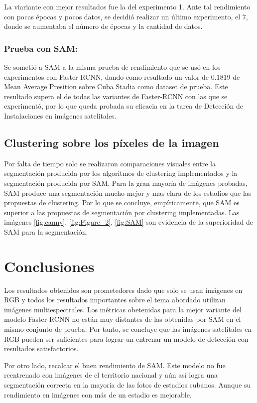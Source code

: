 \documentclass[article]{llncs}
\begin{document}
La viariante con mejor resultados fue la del experimento 1. Ante tal rendimiento con pocas \'epocas y pocos datos, se decidió 
realizar un \'ultimo experimento, el 7, donde se aumentaba el n\'umero de \'epocas y la cantidad de datos.

\subsubsection{Prueba con SAM:} Se someti\'o a SAM a la misma prueba de rendimiento que se us\'o en los experimentos con 
Faster-RCNN, dando como resultado un valor de 0.1819 de Mean Average Presition sobre Cuba Stadia como dataset de prueba.
Este resultado supera el de todas las variantes de Faster-RCNN con las que se experiment\'o, por lo que queda probada su eficacia 
en la tarea de Detección de Instalaciones en im\'agenes satelitales.

\subsection{Clustering sobre los p\'ixeles de la imagen}

Por falta de tiempo solo se realizaron comparaciones visuales entre la segmentación producida por los algoritmos de clustering 
implementados y la segmentación producida por SAM. Para la gran mayor\'ia de im\'agenes probadas, SAM produce 
una segmentación mucho mejor y mas clara de los estadios que las propuestas de clustering. Por lo que se concluye, 
emp\'iricamente, que SAM es superior a las propuestas de segmentación por clustering implementadas. Las im\'agenes 
\ref{fig:canny}, \ref{fig:Figure_2}, \ref{fig:SAM} son evidencia de la superioridad de SAM para la segmentación.

\section{Conclusiones}
Los resultados obtenidos son prometedores dado que solo se usan im\'agenes en RGB y todos los resultados importantes 
sobre el tema abordado utilizan im\'agenes multiespectrales. Los m\'etricas obetenidas para la mejor variante del modelo 
Faster-RCNN no est\'an muy distantes de las obtenidas por SAM en el mismo conjunto de prueba. Por tanto, se concluye 
que las im\'agenes satelitales en RGB pueden ser suficientes para lograr un entrenar un modelo de detección con resultados 
satisfactorios. 

Por otro lado, recalcar el buen rendimiento de SAM. Este modelo no fue reentrenado con im\'agenes de el territorio nacional y 
a\'un as\'i logra una segmentación correcta en la mayor\'ia de las fotos de estadios cubanos. Aunque su rendimiento en im\'agenes 
con m\'as de un estadio es mejorable.
\end{document}
